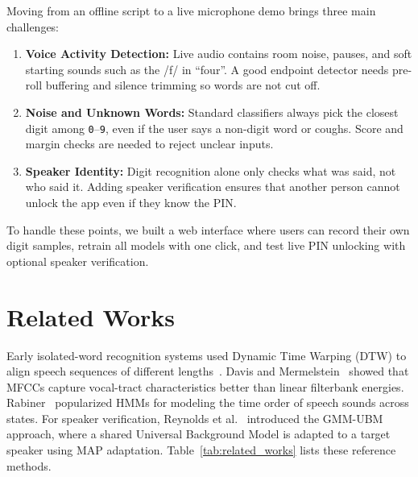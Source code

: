 \documentclass[12pt,a4paper]{article}
\begin{document}
Moving from an offline script to a live microphone demo brings three main challenges:
\begin{enumerate}
    \item \textbf{Voice Activity Detection:} Live audio contains room noise, pauses, and soft starting sounds such as the /f/ in ``four''. A good endpoint detector needs pre-roll buffering and silence trimming so words are not cut off.
    \item \textbf{Noise and Unknown Words:} Standard classifiers always pick the closest digit among \texttt{0}--\texttt{9}, even if the user says a non-digit word or coughs. Score and margin checks are needed to reject unclear inputs.
    \item \textbf{Speaker Identity:} Digit recognition alone only checks what was said, not who said it. Adding speaker verification ensures that another person cannot unlock the app even if they know the PIN.
\end{enumerate}
To handle these points, we built a web interface where users can record their own digit samples, retrain all models with one click, and test live PIN unlocking with optional speaker verification.

\section{Related Works}
Early isolated-word recognition systems used Dynamic Time Warping (DTW) to align speech sequences of different lengths~\cite{sakoe1978dynamic}. Davis and Mermelstein~\cite{davis1980comparison} showed that MFCCs capture vocal-tract characteristics better than linear filterbank energies. Rabiner~\cite{rabiner1989tutorial} popularized HMMs for modeling the time order of speech sounds across states. For speaker verification, Reynolds et al.~\cite{reynolds2000speaker} introduced the GMM-UBM approach, where a shared Universal Background Model is adapted to a target speaker using MAP adaptation. Table~\ref{tab:related_works} lists these reference methods.
\end{document}
